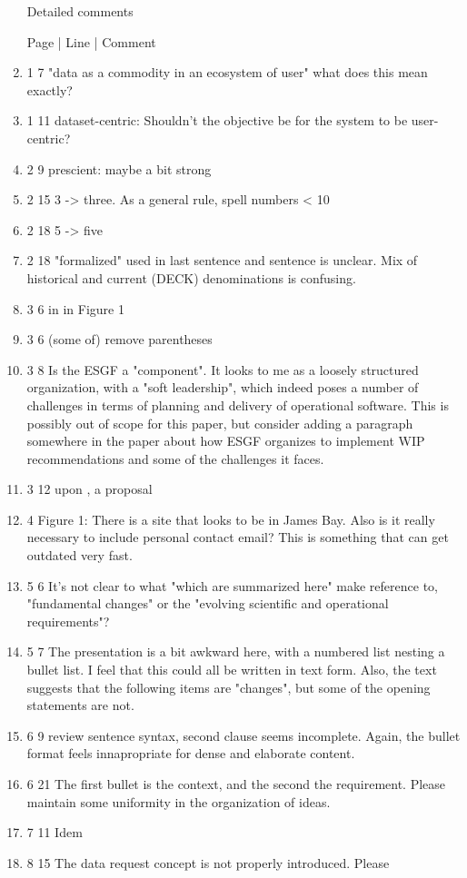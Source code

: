 \documentclass[gmd,manuscript]{copernicus}
\begin{document}
\begin{enumerate}[label=RC2-\arabic*,leftmargin=*]
  Detailed comments

  Page | Line | Comment
\item 1 7 "data as a commodity in an ecosystem of user" what does this
  mean exactly?
\item 1 11 dataset-centric: Shouldn’t the objective be for the system
  to be user-centric?
\item 2 9 prescient: maybe a bit strong
\item 2 15 3 -> three. As a general rule, spell numbers < 10
\item 2 18 5 -> five
\item 2 18 "formalized" used in last sentence and sentence is unclear.
  Mix of historical and current (DECK) denominations is confusing.
\item 3 6 in in Figure 1
\item 3 6 (some of) remove parentheses
\item 3 8 Is the ESGF a "component". It looks to me as a loosely
  structured organization, with a "soft leadership", which indeed
  poses a number of challenges in terms of planning and delivery of
  operational software. This is possibly out of scope for this paper,
  but consider adding a paragraph somewhere in the paper about how
  ESGF organizes to implement WIP recommendations and some of the
  challenges it faces.
\item 3 12 upon , a proposal
\item 4 Figure 1: There is a site that looks to be in James Bay. Also
  is it really necessary to include personal contact email? This is
  something that can get outdated very fast.
\item 5 6 It’s not clear to what "which are summarized here" make
  reference to, "fundamental changes" or the "evolving scientific and
  operational requirements"?
\item 5 7 The presentation is a bit awkward here, with a numbered list
  nesting a bullet list. I feel that this could all be written in text
  form. Also, the text suggests that the following items are
  "changes", but some of the opening statements are not.
\item 6 9 review sentence syntax, second clause seems incomplete.
  Again, the bullet format feels innapropriate for dense and elaborate
  content.
\item 6 21 The first bullet is the context, and the second the
  requirement. Please maintain some uniformity in the organization of
  ideas.
\item 7 11 Idem
\item 8 15 The data request concept is not properly introduced. Please

\end{enumerate}
\end{document}
